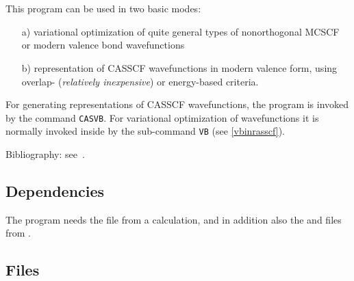 
\section{}
\label{UG:sec:casvb}

This program can be used in two basic modes:
\begin{itemize}
\item[a)] variational optimization of quite general types of
nonorthogonal MCSCF or modern valence bond wavefunctions
\item[b)] representation of CASSCF wavefunctions in modern valence form,
using overlap- ({\em relatively inexpensive\/}) or energy-based criteria.
\end{itemize}

For generating representations of CASSCF wavefunctions, the program
is invoked by the command {\tt CASVB}.
For variational optimization of wavefunctions it is normally invoked
inside  by the sub-command {\tt VB} (see \ref{vbinrasscf}).

Bibliography: see~\cite{casvb1,casvb2,casvb3,casvb4}.

\subsection{Dependencies}
\label{UG:sec:casvb_dependencies}
The  program needs the  file from a  calculation,
and in addition also the  and  files from .

\subsection{Files}
\label{UG:sec:casvb_files}
